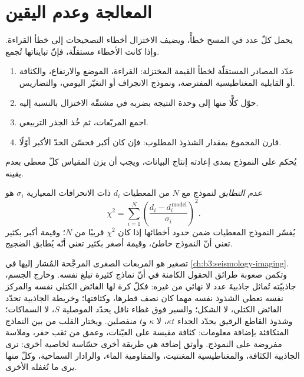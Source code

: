 \section{المعالجة وعدم اليقين}\label{sec:b3:field-lab-methods-3:processing}

يحمل كلّ عدد في المسح خطأً، ويضيف الاختزال
أخطاء التصحيحات إلى خطأ القراءة. وإذا كانت الأخطاء
مستقلّة، فإنّ تبايناتها تُجمع.

\begin{method}\label{met:b3:field-lab-methods-3:budget}
\begin{enumerate}
  \item عدّد المصادر المستقلّة لخطأ القيمة المختزلة: القراءة،
        الموضع والارتفاع، والكثافة أو القابلية المغناطيسية
        المفترضة، ونموذج الانجراف أو التغيّر اليومي، والتضاريس.
  \item حوّل كلًّا منها إلى وحدة النتيجة بضربه في
        مشتقّة الاختزال بالنسبة إليه.
  \item اجمع المربّعات، ثم خُذ الجذر التربيعي.
  \item قارن المجموع بمقدار الشذوذ المطلوب: فإن كان أكبر
        فحسّن الحدّ الأكبر أوّلًا.
\end{enumerate}
\end{method}

يُحكم على النموذج بمدى إعادته إنتاج البيانات، ويجب أن يزن المقياس
كلّ معطى بعدم يقينه.

\begin{definition}\label{def:b3:field-lab-methods-3:inversion-practice}
\emph{عدم التطابق} لنموذج مع $N$ من المعطيات $d_i$ ذات
الانحرافات المعيارية $\sigma_i$ هو
\[
\chi^2 = \sum_{i=1}^N\left(\frac{d_i - d_i^{\,\mathrm{model}}}{\sigma_i}\right)^2 .
\]
يُفسّر النموذج المعطيات ضمن حدود أخطائها إذا كان $\chi^2$ قريبًا
من $N$؛ وقيمة أكبر بكثير تعني أنّ النموذج خاطئ، وقيمة أصغر بكثير
تعني أنّه يُطابق الضجيج.
\end{definition}

تصغير  هو المربعات الصغرى المرجَّحة المُشار إليها في
\cref{ch:b3:seismology-imaging}. وتكمن صعوبة طرائق الحقول الكامنة في أنّ نماذج كثيرة
تبلغ  نفسه. وخارج الجسم، جاذبيّته
تُماثل جاذبيةَ عدد لا نهائي من غيره: فكلّ كرة لها الفائض الكتلي نفسه والمركز نفسه
تعطي الشذوذ نفسه مهما كان نصف قطرها،
وكثافتها؛ وخريطة الجاذبية تحدّد الفائض الكتلي، لا الشكل؛ والسبر
فوق غطاء ناقل يحدّد الموصلية $S$، لا
السماكات؛ وشذوذ القاطع الرقيق يحدّد الجداء $\kappa t$،
لا $\kappa$ و$t$ منفصلين. ويختار القلب من بين
النماذج المتكافئة بإضافة معلومات: كثافة مقيسة على العيّنات،
وعمق من ثقب حفر، وملاسة مفروضة على النموذج. وأوثق
إضافة هي طريقة أخرى حسّاسة لخاصية أخرى: ترى الجاذبية
الكثافة، والمغناطيسية المغنتيت، والمقاومية الماء، والرادار السماحية،
وكلّ منها يرى ما تُغفله الأخرى.

